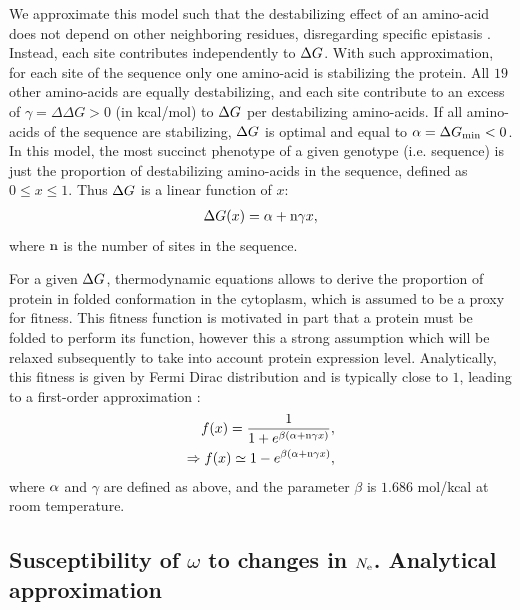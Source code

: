 \documentclass{MBE}%
\begin{document}
We approximate this model such that the destabilizing effect of an amino-acid does not depend on other neighboring residues, disregarding specific epistasis \citep{Dasmeh2014}.
Instead, each site contributes independently to $\Delta G$. 
With such approximation, for each site of the sequence only one amino-acid is stabilizing the protein. 
All $19$ other amino-acids are equally destabilizing, and each site contribute to an excess of $\gamma = \Delta \Delta G > 0$ (in kcal/mol) to $\Delta G$ per destabilizing amino-acids.
If all amino-acids of the sequence are stabilizing, $\Delta G$ is optimal and equal to $ \alpha = \Delta G_{\text{min}} < 0$. 
In this model, the most succinct phenotype of a given genotype (i.e. sequence) is just the proportion of destabilizing amino-acids in the sequence, defined as $0 \leq x \leq 1$. Thus $\Delta G$ is a linear function of $x$:
\begin{align}
 \Delta G (x) = \alpha + \text{n} \gamma x,
\end{align}
where $\text{n}$ is the number of sites in the sequence. 

For a given $\Delta G$, thermodynamic equations allows to derive the proportion of protein in folded conformation in the cytoplasm, which is assumed to be a proxy for fitness.
This fitness function is motivated in part that a protein must be folded to perform its function, however this a strong assumption which will be relaxed subsequently to take into account protein expression level.
Analytically, this fitness is given by Fermi Dirac distribution and is typically close to $1$, leading to a first-order approximation \citep{Goldstein2011}: 
\begin{align}
 f(x) = \dfrac{1}{1 + e^{\beta (\alpha + \text{n} \gamma x)}},\\
 \Rightarrow f(x) \simeq 1 - e^{\beta (\alpha + \text{n} \gamma x)}, 
\end{align}
where $\alpha$ and $\gamma$ are defined as above, and the parameter $\beta$ is $1.686$ mol/kcal at room temperature.

\subsection*{Susceptibility of $\omega$ to changes in $N_{\mathrm{e}}$. Analytical approximation}
\end{document}

